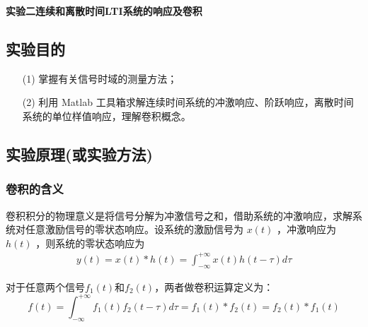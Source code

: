 \documentclass[UTF8,AutoFakeBold]{ctexart}
\begin{document}
	\newpage
	\begin{center}
		{\bfseries\heiti{}实验二\quad 连续和离散时间LTI系统的响应及卷积}
	\end{center}
	\setcounter{section}{1}
	\subsection{{\heiti{}实验目的}}
	\begin{enumerate}
		\item [(1)] 掌握有关信号时域的测量方法；
		\item [(2)] 利用 Matlab 工具箱求解连续时间系统的冲激响应、阶跃响应，离散时间系统的单位样值响应，理解卷积概念。
	\end{enumerate}
	\subsection{{\heiti{}实验原理(或实验方法)}}
	\subsubsection{{\heiti{}卷积的含义}}
		卷积积分的物理意义是将信号分解为冲激信号之和，借助系统的冲激响应，求解系统对任意激励信号的零状态响应。设系统的激励信号为
		$x(t)$ ，冲激响应为 $h(t)$ ，则系统的零状态响应为
		\begin{align}
		y(t)=x(t)*h(t)= \int_{-\infty}^{+\infty}x(t)h(t-\tau )d\tau
		\end{align}\par
		对于任意两个信号$f_1(t)$和$f_2(t)$，两者做卷积运算定义为：
		\begin{equation}
		f(t)=\int_{-\infty}^{+\infty}f_1(t)f_2(t-\tau)d\tau=f_1(t)*f_2(t)=f_2(t)*f_1(t)
		\end{equation}\par
\end{document}
